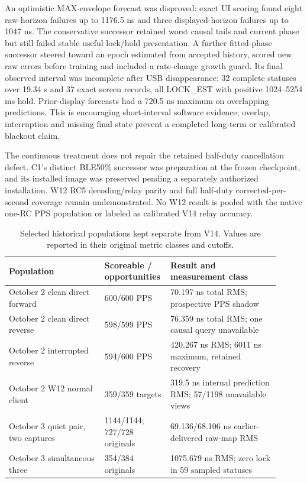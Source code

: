\documentclass[11pt,letterpaper]{article}
\begin{document}
An optimistic MAX-envelope forecast was disproved: exact UI scoring found eight raw-horizon failures up to 1176.5 ns and three displayed-horizon failures up to 1047 ns. The conservative successor retained worst causal tails and current phase but still failed stable useful lock/hold presentation. A further fitted-phase successor steered toward an epoch estimated from accepted history, scored new raw errors before training and included a rate-change growth guard. Its final observed interval was incomplete after USB disappearance: 32 complete statuses over 19.34 s and 37 exact screen records, all LOCK\_EST with positive 1024--5254 ms hold. Prior-display forecasts had a 720.5 ns maximum on overlapping predictions. This is encouraging short-interval software evidence; overlap, interruption and missing final state prevent a completed long-term or calibrated blackout claim.

The continuous treatment does not repair the retained half-duty cancellation defect. C1's distinct BLE50\% successor was preparation at the frozen checkpoint, and its installed image was preserved pending a separately authorized installation. W12 RC5 decoding/relay parity and full half-duty corrected-per-second coverage remain undemonstrated. No W12 result is pooled with the native one-RC PPS population or labeled as calibrated V14 relay accuracy.

\begin{table}[htbp]\centering\small
\caption{Selected historical populations kept separate from V14. Values are reported in their original metric classes and cutoffs.}\label{tab:history}
\begin{tabular}{@{}L{0.34\linewidth}L{0.18\linewidth}L{0.39\linewidth}@{}}\toprule
Population & Scoreable / opportunities & Result and measurement class\\\midrule
October 2 clean direct forward &600/600 PPS&70.197 ns total RMS; prospective PPS shadow\\
October 2 clean direct reverse &598/599 PPS&76.359 ns total RMS; one causal query unavailable\\
October 2 interrupted reverse &594/600 PPS&420.267 ns RMS; 6011 ns maximum, retained recovery\\
October 2 W12 normal client &359/359 targets&319.5 ns internal prediction RMS; 57/1198 unavailable views\\
October 3 quiet pair, two captures &1144/1144; 727/728 originals&69.136/68.106 ns earlier-delivered raw-map RMS\\
October 3 simultaneous three &354/384 originals&1075.679 ns RMS; zero lock in 59 sampled statuses\\\bottomrule
\end{tabular}
\end{table}
\end{document}
